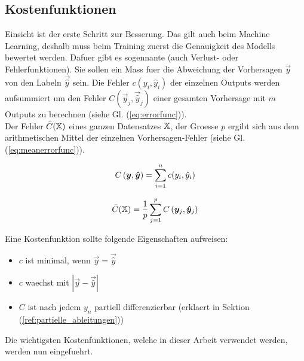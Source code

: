 \subsection{Kostenfunktionen}
Einsicht ist der erste Schritt zur Besserung. Das gilt auch beim Machine Learning, deshalb muss beim Training zuerst die Genauigkeit des Modells bewertet werden.
Dafuer gibt es sogennante  (auch Verlust- oder
Fehlerfunktionen).
Sie sollen ein Mass fuer die Abweichung der Vorhersagen $\vec{y}$ von den Labeln $\vec{\hat{y}}$ sein.
\para{}
Die Fehler $c(y_i,\hat{y}_i)$ der einzelnen Outputs werden aufsummiert um den
Fehler $C(\vec{y}_j,\vec{\hat{y}}_j)$ einer gesamten Vorhersage mit $m$ Outputs
zu berechnen (siehe Gl. (\ref{eq:errorfunc})). \\
Der Fehler $\bar{C}(\mathbb{X})$ eines ganzen Datensatzes $\mathbb{X}$, der
Groesse $p$ ergibt sich aus dem arithmetischen
Mittel der einzelnen Vorhersagen-Fehler (siehe Gl. (\ref{eq:meanerrorfunc})).
\\
\begin{minipage}[h!]{0.5\textwidth}
  \begin{equation}\label{eq:errorfunc}
    C \left(\bm{y},\bm{\hat{y}} \right)=\displaystyle\sum_{i=1}^{n} c(y_i, \hat{y}_i)
  \end{equation}
\end{minipage}
\begin{minipage}[h!]{0.5\textwidth}
  \begin{equation}\label{eq:meanerrorfunc}
    \bar{C}(\mathbb{X}) = \frac{1}{p}\displaystyle\sum_{j=1}^{p} C\left(\bm{y}_j,\bm{\hat{y}}_j\right)
  \end{equation}
\end{minipage}
\para{}
Eine Kostenfunktion sollte folgende Eigenschaften aufweisen:
\begin{itemize}
\item{$c$ ist minimal, wenn $\vec{y} = \vec{\hat{y}}$}
\item{$c$ waechst mit $|\vec{y}-\vec{\hat{y}}|$}
\item{$C$ ist nach jedem $y_n$ partiell differenzierbar (erklaert in Sektion (\ref{ref:partielle_ableitungen}))}
\end{itemize}
\para{}
Die wichtigsten Kostenfunktionen, welche in dieser Arbeit verwendet werden,
werden nun eingefuehrt.

